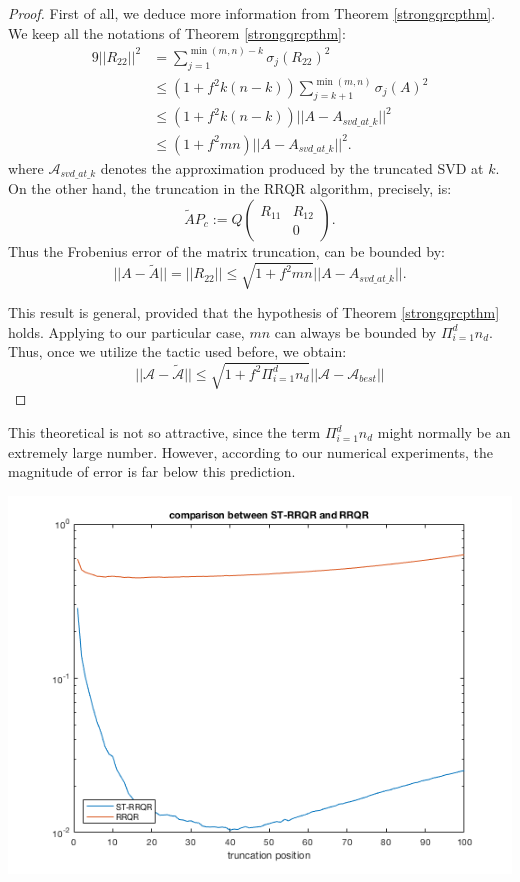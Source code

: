 \documentclass[12pt]{article}
\begin{document}
\begin{proof}
First of all, we deduce more information from Theorem \ref{strongqrcpthm}. We keep all the notations of Theorem \ref{strongqrcpthm}:
\begin{alignat*}{9}
 || R_{22} || ^ 2 & = \sum_{j = 1}^{\min(m, n) - k} \sigma_j (R_{22})^2 \\
 & \leq (1 + f^2k(n-k)) \sum_{j = k + 1} ^ {\min(m, n)} \sigma_j (A) ^ 2 \\
 & \leq (1 + f^2k(n-k)) || A - A_{svd\_at\_k} || ^ 2 \\
 & \leq (1 + f^2mn) || A - A_{svd\_at\_k} || ^ 2 .
\end{alignat*}
where $\mathcal{A}_{svd\_at\_k}$ denotes the approximation produced by the truncated SVD at $k$. On the other hand, the truncation in the RRQR algorithm, precisely, is:
$$ 
\tilde{A}P_c := Q
\begin{pmatrix}
R_{11} & R_{12}  \\
           & 0
\end{pmatrix}.
$$
Thus the Frobenius error of the matrix truncation, can be bounded by:
$$ || A - \tilde{A} || = || R_{22} || \leq \sqrt{1 + f^2mn} || A - A_{svd\_at\_k} || .$$

This result is general, provided that the hypothesis of Theorem \ref{strongqrcpthm} holds. Applying to our particular case, $mn$ can always be bounded by $\Pi_{i = 1}^d n_d$. Thus, once we utilize the tactic used before, we obtain:
$$ || \mathcal{A} - \tilde{\mathcal{A}} || \leq \sqrt{1 + f^2 \Pi_{i = 1}^d n_d} || \mathcal{A} - \mathcal{A}_{best} || $$
\end{proof}

This theoretical is not so attractive, since the term $\Pi_{i = 1}^d n_d$ might normally be an extremely large number. However, according to our numerical experiments, the magnitude of error is far below this prediction.

\centerline{\includegraphics[scale=0.7]{tensorRRQR}}
\end{document}
